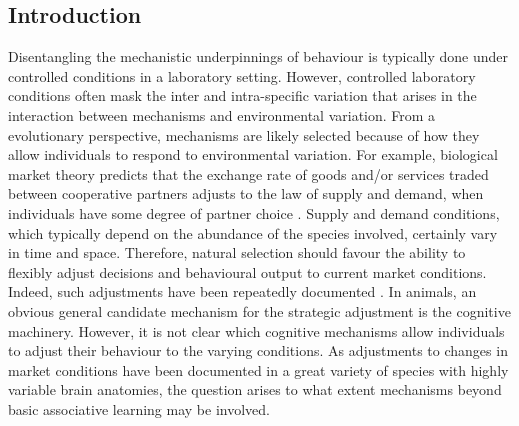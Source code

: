 \documentclass[]{rsos}%
\begin{document}
\providecommand{\EndFirstPage}{%
}

\maketitle

\hypertarget{introduction}{%
\subsection{Introduction}\label{introduction}}

Disentangling the mechanistic underpinnings of behaviour
is typically done under controlled conditions in a laboratory setting. However,
controlled laboratory conditions often mask the inter and intra-specific
variation that arises in the interaction between mechanisms and
environmental variation. From a evolutionary perspective, mechanisms
are likely selected because of how they allow individuals to respond to
environmental variation. For example, biological market theory predicts that
the exchange rate of goods and/or services traded between cooperative
partners adjusts to the law of supply and demand, when individuals have
some degree of partner choice \citep{noe_Biological_1995a}.
Supply and demand conditions, which typically
depend on the abundance of the species involved, certainly vary in time
and space. Therefore, natural selection should
favour the ability to flexibly adjust decisions and behavioural output to
current market conditions. Indeed, such adjustments have been repeatedly
documented \citep{axen_Signalling_1996}. In animals, an obvious general candidate
mechanism for the strategic adjustment is the cognitive machinery. However,
it is not clear which cognitive mechanisms allow individuals to adjust their
behaviour to the varying conditions. As adjustments to changes in
market conditions have been documented in a great variety of species with
highly variable brain anatomies, the question arises to what extent mechanisms
beyond basic associative learning may be involved.
\end{document}

